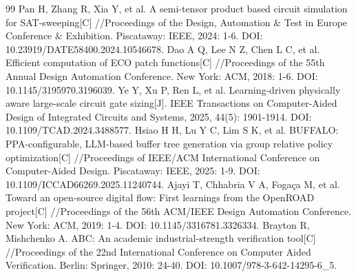 \documentclass[twocolumn,10pt,fontset=windows]{ctexart}
\begin{document}
\begin{thebibliography}{99}
 Pan H, Zhang R, Xia Y, et al. A semi-tensor product based circuit simulation for SAT-sweeping[C] //Proceedings of the Design, Automation \& Test in Europe Conference \& Exhibition. Piscataway: IEEE, 2024: 1-6. DOI: 10.23919/DATE58400.2024.10546678.
 Dao A Q, Lee N Z, Chen L C, et al. Efficient computation of ECO patch functions[C] //Proceedings of the 55th Annual Design Automation Conference. New York: ACM, 2018: 1-6. DOI: 10.1145/3195970.3196039.
 Ye Y, Xu P, Ren L, et al. Learning-driven physically aware large-scale circuit gate sizing[J]. IEEE Transactions on Computer-Aided Design of Integrated Circuits and Systems, 2025, 44(5): 1901-1914. DOI: 10.1109/TCAD.2024.3488577.
 Hsiao H H, Lu Y C, Lim S K, et al. BUFFALO: PPA-configurable, LLM-based buffer tree generation via group relative policy optimization[C] //Proceedings of IEEE/ACM International Conference on Computer-Aided Design. Piscataway: IEEE, 2025: 1-9. DOI: 10.1109/ICCAD66269.2025.11240744.
 Ajayi T, Chhabria V A, Fogaça M, et al. Toward an open-source digital flow: First learnings from the OpenROAD project[C] //Proceedings of the 56th ACM/IEEE Design Automation Conference. New York: ACM, 2019: 1-4. DOI: 10.1145/3316781.3326334.
 Brayton R, Mishchenko A. ABC: An academic industrial-strength verification tool[C] //Proceedings of the 22nd International Conference on Computer Aided Verification. Berlin: Springer, 2010: 24-40. DOI: 10.1007/978-3-642-14295-6\_5.
\end{thebibliography}
\end{document}
